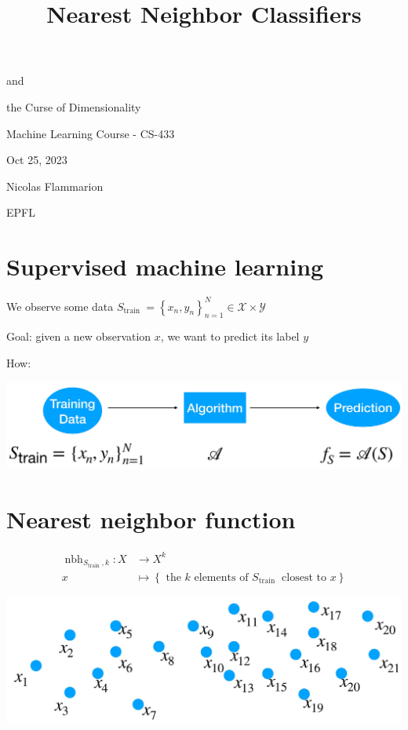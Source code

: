 \documentclass[10pt]{article}
\title{Nearest Neighbor Classifiers }
\author{}
\date{}
\begin{document}
\maketitle
and

the Curse of Dimensionality

Machine Learning Course - CS-433

Oct 25, 2023

Nicolas Flammarion

EPFL

\section*{Supervised machine learning}
We observe some data $S_{\text {train }}=\left\{x_{n}, y_{n}\right\}_{n=1}^{N} \in \mathscr{X} \times \mathscr{Y}$

Goal: given a new observation $x$, we want to predict its label $y$

How:

\begin{center}
\includegraphics[max width=\textwidth]{2023_12_30_f937b0007b5d87b39f79g-02}
\end{center}

\section*{Nearest neighbor function}
$$
\begin{aligned}
\operatorname{nbh}_{S_{\text {train }}, k}: X & \rightarrow X^{k} \\
x & \mapsto\left\{\text { the } k \text { elements of } S_{\text {train }} \text { closest to } x\right\}
\end{aligned}
$$

\begin{center}
\includegraphics[max width=\textwidth]{2023_12_30_f937b0007b5d87b39f79g-03}
\end{center}
\end{document}
